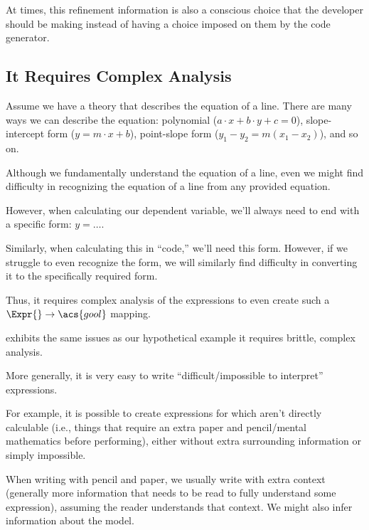 At times, this refinement information is also a conscious choice that the
developer should be making instead of having a choice imposed on them by the
code generator.



\subsection{It Requires Complex Analysis}






Assume we have a theory that describes the equation of a line. There are many
ways we can describe the equation: polynomial (\(a \cdot{} x + b \cdot{} y + c =
0\)), slope-intercept form (\(y = m \cdot{} x + b\)), point-slope form (\(y_1 -
y_2 = m(x_1 - x_2)\)), and so on.

Although we fundamentally understand the equation of a line, even we might find
difficulty in recognizing the equation of a line from any provided equation.

However, when calculating our dependent variable, we'll always need to end with
a specific form: \(y = \ldots{}\).

Similarly, when calculating this in ``code,'' we'll need this form. However, if
we struggle to even recognize the form, we will similarly find difficulty in
converting it to the specifically required form.

Thus, it requires complex analysis of the expressions to even create such a
\(\Expr{} \rightarrow \acs{gool}\) mapping.

\RelationConcept{} exhibits the same issues as our hypothetical example
\textemdash{} it requires brittle, complex analysis.




More generally, it is very easy to write ``difficult/impossible to interpret''
expressions.

For example, it is possible to create expressions for which aren't directly
calculable (i.e., things that require an extra paper and pencil/mental
mathematics before performing), either without extra surrounding information or
simply impossible.




When writing with pencil and paper, we usually write with extra context
(generally more information that needs to be read to fully understand some
expression), assuming the reader understands that context. We might also infer
information about the model.

